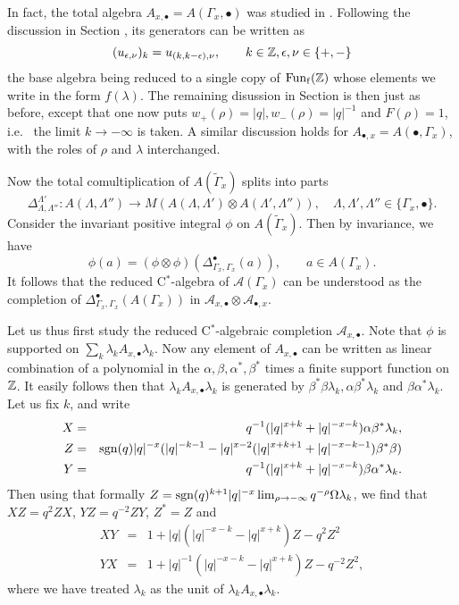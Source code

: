 In fact, the total algebra $A_{x,\bullet} = A(\Gamma_x,\bullet)$ was studied in \cite{DCY1}. Following the discussion in Section \cite{SecUni}, its generators can be written as \[(u_{\epsilon,\nu})_{k} =  u_{(k,k-\epsilon),\nu}, \qquad k\in \mathbb{Z},\epsilon,\nu \in \{+,-\}\] the base algebra being reduced to a single copy of $\mathrm{Fun}_{\operatorname{\mathrm{f}}}(\mathbb{Z})$ whose elements we write in the form $f(\lambda)$. The remaining disussion in Section \cite{SecUni} is then just as before, except that one now puts $w_+(\rho) = |q|, w_-(\rho) = |q|^{-1}$ and $F(\rho) =1$, i.e.~ the limit $k\rightarrow -\infty$ is taken. A similar discussion holds for $A_{\bullet,x} = A(\bullet,\Gamma_x)$, with the roles of $\rho$ and $\lambda$ interchanged. 

Now the total comultiplication of $A(\widetilde{\Gamma}_x)$ splits into parts \[\Delta_{\Lambda,\Lambda''}^{\Lambda'}: A(\Lambda,\Lambda'')\rightarrow M(A(\Lambda,\Lambda')\otimes A(\Lambda',\Lambda'')),\quad \Lambda,\Lambda',\Lambda'' \in \{\Gamma_x,\bullet\}.\] Consider the invariant positive integral $\phi$ on $A(\widetilde{\Gamma}_x)$. Then by invariance, we have \[\phi(a) = (\phi\otimes \phi)(\Delta_{\Gamma_x,\Gamma_x}^{\bullet}(a)),\qquad a \in A(\Gamma_x).\] It follows that the reduced C$^*$-algebra of $\mathcal{A}(\Gamma_x)$ can be understood as the completion of $\Delta_{\Gamma_x,\Gamma_x}^{\bullet}(A(\Gamma_x))$ in $\mathcal{A}_{x,\bullet}\otimes \mathcal{A}_{\bullet,x}$. 

Let us thus first study the reduced C$^*$-algebraic completion $\mathcal{A}_{x,\bullet}$. Note that $\phi$ is supported on $\sum_k \lambda_k A_{x,\bullet}\lambda_k$. Now any element of $A_{x,\bullet}$ can be written as linear combination of a polynomial in the $\alpha,\beta,\alpha^*,\beta^*$ times a finite support function on $\mathbb{Z}$. It easily follows then that $\lambda_k A_{x,\bullet}\lambda_k$ is generated by $\beta^*\beta\lambda_k,\alpha\beta^*\lambda_k$ and $\beta\alpha^*\lambda_k$. Let us fix $k$, and write \begin{eqnarray*} X &=& q^{-1}(|q|^{x+k}+|q|^{-x-k})\alpha \beta^*\lambda_k,\\ Z &=& \operatorname{\mathrm{sgn}}(q) |q|^{-x}(|q|^{-k-1}-|q|^{x-2}(|q|^{x+k+1}+|q|^{-x-k-1})\beta^*\beta)\\ 
Y &=& q^{-1}(|q|^{x+k}+|q|^{-x-k})\beta \alpha^*\lambda_k.\end{eqnarray*}  Then using that formally $Z = \operatorname{\mathrm{sgn}}(q)^{k+1}|q|^{-x} \lim_{\rho\rightarrow -\infty} q^{-\rho}\Omega \lambda_k$, we find that $XZ = q^2ZX$, $YZ = q^{-2}ZY$, $Z^*=Z$ and \begin{eqnarray*} XY &=& 1+ |q| (|q|^{-x-k}-|q|^{x+k})Z -  q^2 Z^2 \\ YX &=& 1+ |q|^{-1}(|q|^{-x-k}-|q|^{x+k})Z-q^{-2}Z^2,
\end{eqnarray*}
where we have treated $\lambda_k$ as the unit of $\lambda_k A_{x,\bullet}\lambda_k$.

